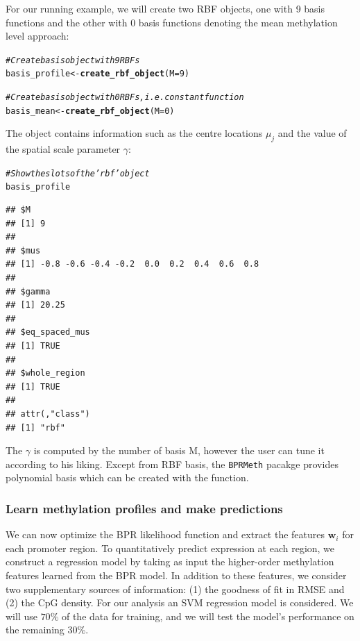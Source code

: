 \documentclass{article}\usepackage[]{graphicx}\usepackage[]{color}
\makeatletter
\newcommand{\hlnum}[1]{\textcolor[rgb]{0.686,0.059,0.569}{#1}}%
\newcommand{\hlcom}[1]{\textcolor[rgb]{0.678,0.584,0.686}{\textit{#1}}}%
\newcommand{\hlstd}[1]{\textcolor[rgb]{0.345,0.345,0.345}{#1}}%
\newcommand{\hlkwb}[1]{\textcolor[rgb]{0.69,0.353,0.396}{#1}}%
\newcommand{\hlkwc}[1]{\textcolor[rgb]{0.333,0.667,0.333}{#1}}%
\newcommand{\hlkwd}[1]{\textcolor[rgb]{0.737,0.353,0.396}{\textbf{#1}}}%
\newenvironment{kframe}{%
 \def\at@end@of@kframe{}%
 \ifinner\ifhmode%
  \def\at@end@of@kframe{\end{minipage}}%
  \begin{minipage}{\columnwidth}%
 \fi\fi%
 \def\FrameCommand##1{\hskip\@totalleftmargin \hskip-\fboxsep
 \colorbox{shadecolor}{##1}\hskip-\fboxsep
     \hskip-\linewidth \hskip-\@totalleftmargin \hskip\columnwidth}%
 \MakeFramed {\advance\hsize-\width
   \@totalleftmargin\z@ \linewidth\hsize
   \@setminipage}}%
 {\par\unskip\endMakeFramed%
 \at@end@of@kframe}
\newenvironment{knitrout}{}{} %
\makeatother
\begin{document}
For our running example, we will create two RBF objects, one with 9 basis functions and the other with 0 basis functions denoting the mean methylation level approach:
\begin{knitrout}
\color{fgcolor}\begin{kframe}
\begin{alltt}
\hlcom{# Create basis object with 9 RBFs}
\hlstd{basis_profile} \hlkwb{<-} \hlkwd{create_rbf_object}\hlstd{(}\hlkwc{M} \hlstd{=} \hlnum{9}\hlstd{)}

\hlcom{# Create basis object with 0 RBFs, i.e. constant function}
\hlstd{basis_mean} \hlkwb{<-} \hlkwd{create_rbf_object}\hlstd{(}\hlkwc{M} \hlstd{=} \hlnum{0}\hlstd{)}
\end{alltt}
\end{kframe}
\end{knitrout}

The  object contains information such as the centre locations $\mu_{j}$ and the value of the spatial scale parameter $\gamma$:
\begin{knitrout}
\color{fgcolor}\begin{kframe}
\begin{alltt}
\hlcom{# Show the slots of the 'rbf' object}
\hlstd{basis_profile}
\end{alltt}
\begin{verbatim}
## $M
## [1] 9
## 
## $mus
## [1] -0.8 -0.6 -0.4 -0.2  0.0  0.2  0.4  0.6  0.8
## 
## $gamma
## [1] 20.25
## 
## $eq_spaced_mus
## [1] TRUE
## 
## $whole_region
## [1] TRUE
## 
## attr(,"class")
## [1] "rbf"
\end{verbatim}
\end{kframe}
\end{knitrout}
The $\gamma$ is computed by the number of basis M, however the user can tune it according to his liking. Except from RBF basis, the \verb|BPRMeth| pacakge provides polynomial basis which can be created with the  function.

\subsubsection{Learn methylation profiles and make predictions}
We can now optimize the BPR likelihood function and extract the features $\mathbf{w}_{i}$ for each promoter region. To quantitatively predict expression at each region, we construct a regression model by taking as input the higher-order methylation features learned from the BPR model. In addition to these features, we consider two supplementary sources of information: (1) the goodness of fit in RMSE and (2) the CpG density. For our analysis an SVM regression model is considered. We will use $70\%$ of the data for training, and we will test the model's performance on the remaining $30\%$.
\end{document}
